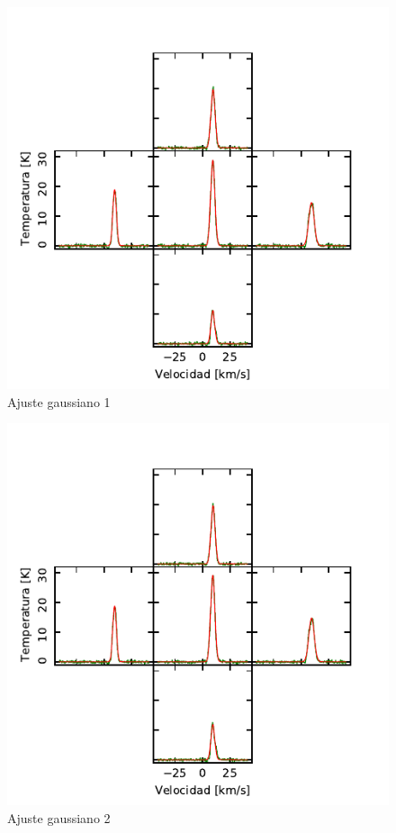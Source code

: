 \begin{figure}[htbp]
	\centering
	\includegraphics{specfit1.pdf}
	\caption{Ajuste gaussiano 1}
	\label{fig:specfit1}
\end{figure}

\begin{figure}[htbp]
	\centering
	\includegraphics{specfit2.pdf}
	\caption{Ajuste gaussiano 2}
	\label{fig:specfit2}
\end{figure}

